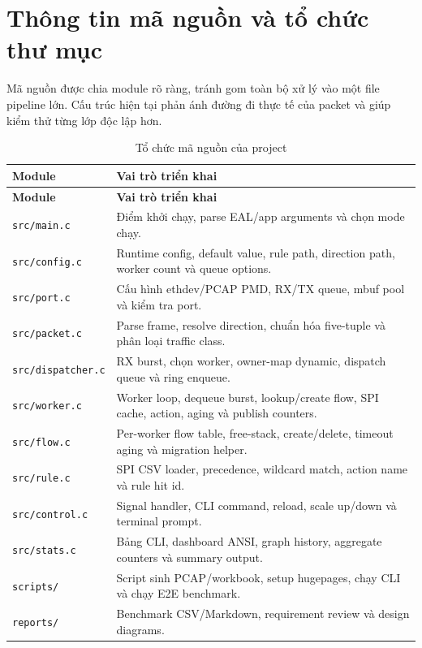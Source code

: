 \documentclass[12pt,a4paper,twoside]{report}
\newcommand{\code}[1]{\texttt{#1}}
\begin{document}
\section{Thông tin mã nguồn và tổ chức thư mục}
Mã nguồn được chia module rõ ràng, tránh gom toàn bộ xử lý vào một file
pipeline lớn. Cấu trúc hiện tại phản ánh đường đi thực tế của packet và giúp
kiểm thử từng lớp độc lập hơn.

\begin{longtable}{L{3.8cm} L{9.0cm}}
\caption{Tổ chức mã nguồn của project}\label{tab:module_tree}\\
\toprule
\textbf{Module} & \textbf{Vai trò triển khai} \\
\midrule
\endfirsthead
\toprule
\textbf{Module} & \textbf{Vai trò triển khai} \\
\midrule
\endhead
\code{src/main.c} & Điểm khởi chạy, parse EAL/app arguments và chọn mode chạy. \\
\code{src/config.c} & Runtime config, default value, rule path, direction path, worker count và queue options. \\
\code{src/port.c} & Cấu hình ethdev/PCAP PMD, RX/TX queue, mbuf pool và kiểm tra port. \\
\code{src/packet.c} & Parse frame, resolve direction, chuẩn hóa five-tuple và phân loại traffic class. \\
\code{src/dispatcher.c} & RX burst, chọn worker, owner-map dynamic, dispatch queue và ring enqueue. \\
\code{src/worker.c} & Worker loop, dequeue burst, lookup/create flow, SPI cache, action, aging và publish counters. \\
\code{src/flow.c} & Per-worker flow table, free-stack, create/delete, timeout aging và migration helper. \\
\code{src/rule.c} & SPI CSV loader, precedence, wildcard match, action name và rule hit id. \\
\code{src/control.c} & Signal handler, CLI command, reload, scale up/down và terminal prompt. \\
\code{src/stats.c} & Bảng CLI, dashboard ANSI, graph history, aggregate counters và summary output. \\
\code{scripts/} & Script sinh PCAP/workbook, setup hugepages, chạy CLI và chạy E2E benchmark. \\
\code{reports/} & Benchmark CSV/Markdown, requirement review và design diagrams. \\
\bottomrule
\end{longtable}
\end{document}
